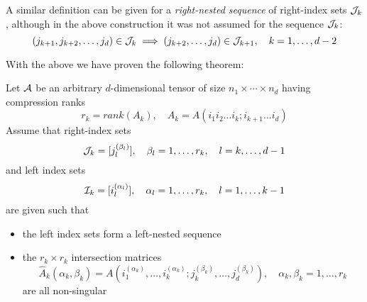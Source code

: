 A similar definition can be given for a \emph{right-nested sequence} of right-index sets $\mathcal{J}_k$, although in the above construction it was not assumed for the sequence $\mathcal{J}_k$:
\begin{equation}
  (j_{k+1},j_{k+2},\ldots,j_d) \in \mathcal{J}_k \implies (j_{k+2},\ldots,j_d) \in \mathcal{J}_{k+1}, \quad k=1,\ldots,d-2
\end{equation}

With the above we have proven the following theorem:
\begin{Teo}
  Let $\mathcal{A}$ be an arbitrary $d$-dimensional tensor of size $n_1 \times \cdots \times n_d$ having compression ranks
  \begin{equation*}
    r_k = rank(A_k), \quad A_k = A(i_1 i_2 \ldots i_k;i_{k+1} \ldots i_d)
  \end{equation*}
  Assume that right-index sets
  \begin{equation*}
    \mathcal{J}_k = [j_l^{(\beta_l)}], \quad \beta_l = 1,\ldots,r_k, \quad l = k,\ldots,d-1
  \end{equation*}
  and left index sets
  \begin{equation*}
    \mathcal{I}_k = [i_l^{(\alpha_l)}], \quad \alpha_l = 1,\ldots,r_k, \quad l = 1,\ldots,k-1
  \end{equation*}
  are given such that
  \begin{itemize}
  \item the left index sets form a left-nested sequence
  \item the $r_k \times r_k$ intersection matrices
    \begin{equation*}
      \hat{A}_k(\alpha_k,\beta_k) = A(i_1^{(\alpha_k)}, \ldots, i_k^{(\alpha_k)}; j_k^{(\beta_k)}, \ldots, j_d^{(\beta_k)}), \quad \alpha_k,\beta_k = 1,\ldots,r_k
    \end{equation*}
    are all non-singular
  \end{itemize}


\end{Teo}
